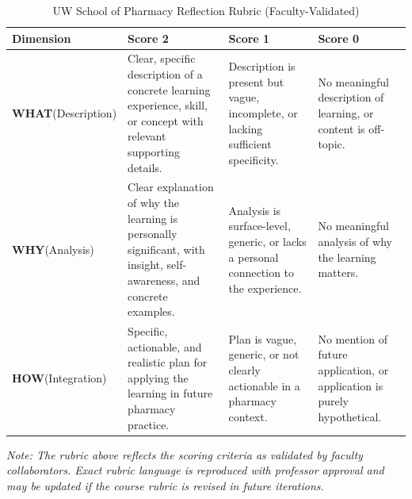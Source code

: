 \documentclass[11pt]{article}
\begin{document}
\begin{table}[H]
\centering
\caption{UW School of Pharmacy Reflection Rubric (Faculty-Validated)}
\label{tab:rubric}
\begin{tabular}{p{2.2cm}p{3.8cm}p{3.8cm}p{3.8cm}}
\toprule
\textbf{Dimension} & \textbf{Score 2} & \textbf{Score 1} & \textbf{Score 0} \\
\midrule
\textbf{WHAT}\newline(Description) &
Clear, specific description of a concrete learning experience, skill, or concept with relevant supporting details. &
Description is present but vague, incomplete, or lacking sufficient specificity. &
No meaningful description of learning, or content is off-topic. \\
\midrule
\textbf{WHY}\newline(Analysis) &
Clear explanation of why the learning is personally significant, with insight, self-awareness, and concrete examples. &
Analysis is surface-level, generic, or lacks a personal connection to the experience. &
No meaningful analysis of why the learning matters. \\
\midrule
\textbf{HOW}\newline(Integration) &
Specific, actionable, and realistic plan for applying the learning in future pharmacy practice. &
Plan is vague, generic, or not clearly actionable in a pharmacy context. &
No mention of future application, or application is purely hypothetical. \\
\bottomrule
\end{tabular}
\end{table}

\noindent\textit{Note: The rubric above reflects the scoring criteria as validated by faculty collaborators. Exact rubric language is reproduced with professor approval and may be updated if the course rubric is revised in future iterations.}
\end{document}
